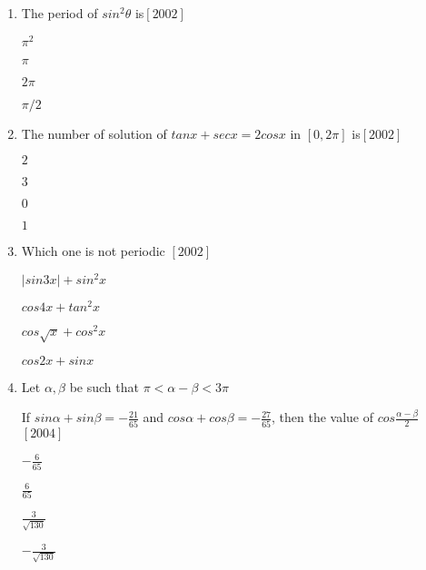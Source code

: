 \documentclass[journal,12pt,twocolumn]{IEEEtran}
\theoremstyle{remark}
\begin{document}
\begin{enumerate}[label={\arabic*}.]
\item The period of $sin^2 \theta$ is\hfill{$[2002]$} 

\begin{multicols}{4}

 $\pi^2$
\columnbreak

 $\pi$
\columnbreak

 $2\pi$
\columnbreak

 $\pi/2$
\end{multicols}
\medskip

\item The number of solution of $tanx + secx=2cosx$ in $[0,2\pi]$ is\hfill{$[2002]$} 

\begin{multicols}{4}

 $2$
\columnbreak

 $3$
\columnbreak

 $0$
\columnbreak

 $1$
\end{multicols}
\medskip

\item Which one is not periodic \hfill{$[2002]$}
\medskip
\begin{multicols}{2}

 $|sin3x|+sin^2 x$

 $cos4x+tan^2 x$
\columnbreak

 $cos\sqrt{x}+cos^2 x$

 $cos2x+sinx$
\end{multicols}

\medskip
\item Let $\alpha,\beta$ be such that $\pi<\alpha-\beta<3\pi$

\smallskip
If $sin\alpha+sin\beta=-\frac{21}{65}$ and $cos\alpha+cos\beta=-\frac{27}{65}$, then the value of $cos\frac{\alpha-\beta}{2}$\hfill{$[2004]$}
\medskip

\begin{multicols}{2}

 $-\frac{6}{65}$

 $\frac{6}{65}$
\columnbreak

 $\frac{3}{\sqrt{130}}$

 $-\frac{3}{\sqrt{130}}$

\end{multicols}


\end{enumerate}
\end{document}
